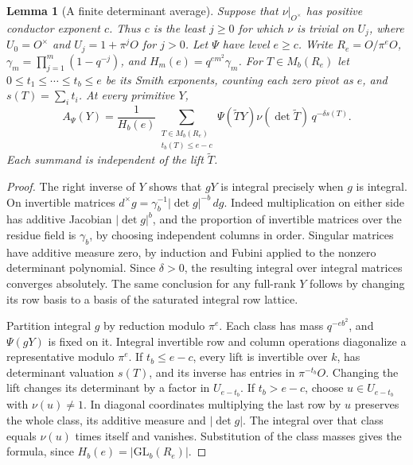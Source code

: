 \documentclass[a4paper,11pt]{article}
\newtheorem{lemma}[proposition]{Lemma}
\theoremstyle{definition}
\theoremstyle{remark}
\numberwithin{equation}{section}
\begin{document}
\begin{lemma}[A finite determinant average]\label{lem:ramifiedsum334}
Suppose that \(\nu|_{O^\times}\) has positive conductor exponent \(c\). Thus
\(c\) is the least \(j\ge0\) for which \(\nu\) is trivial on \(U_j\),
where \(U_0=O^\times\) and \(U_j=1+\pi^jO\) for \(j>0\).
Let \(\Psi\) have level \(e\ge c\). Write \(R_e=O/\pi^eO\),
\(\gamma_m=\prod_{j=1}^m(1-q^{-j})\), and \(H_m(e)=q^{em^2}\gamma_m\).
For \(T\in M_b(R_e)\) let \(0\le t_1\le\cdots\le t_b\le e\)
be its Smith exponents, counting each zero pivot as \(e\), and
\(s(T)=\sum_i t_i\). At every primitive \(Y\),
\[
 A_\Psi(Y)=\frac{1}{H_b(e)}
 \sum_{\substack{T\in M_b(R_e)\\t_b(T)\le e-c}}
  \Psi(\widetilde T Y)\nu(\det\widetilde T)\,q^{-\delta s(T)}.
\]
Each summand is independent of the lift \(\widetilde T\).
\end{lemma}
\begin{proof}
The right inverse of \(Y\) shows that \(gY\) is integral precisely
when \(g\) is integral. On invertible matrices
\(d^\times g=\gamma_b^{-1}|\det g|^{-b}\,dg\). Indeed multiplication on
either side has additive Jacobian \(|\det g|^b\), and the proportion of
invertible matrices over the residue field is \(\gamma_b\), by choosing
independent columns in order. Singular matrices have additive measure
zero, by induction and Fubini applied to the nonzero determinant
polynomial. Since \(\delta>0\), the resulting integral over integral
matrices converges absolutely. The same conclusion for any full-rank
\(Y\) follows by changing its row basis to a basis of the saturated
integral row lattice.

Partition integral \(g\) by reduction modulo \(\pi^e\). Each class has
mass \(q^{-eb^2}\), and \(\Psi(gY)\) is fixed on it. Integral invertible
row and column operations diagonalize a representative modulo \(\pi^e\).
If \(t_b\le e-c\), every lift is invertible over \(k\), has determinant
valuation \(s(T)\), and its inverse has entries in \(\pi^{-t_b}O\).
Changing the lift changes its determinant by a factor in \(U_{e-t_b}\).
If \(t_b>e-c\), choose \(u\in U_{e-t_b}\) with \(\nu(u)\ne1\). In
diagonal coordinates multiplying the last row by \(u\) preserves the
whole class, its additive measure and \(|\det g|\). The integral over
that class equals \(\nu(u)\) times itself and vanishes. Substitution of
the class masses gives the formula, since \(H_b(e)=|\mathrm{GL}_b(R_e)|\).
\end{proof}
\end{document}

